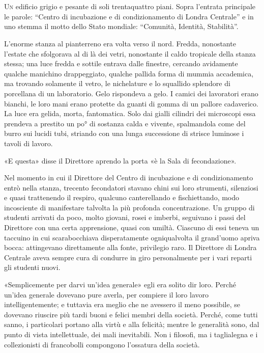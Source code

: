 \documentclass[
a5paper, %
10pt, %
twoside, 
onecolumn, %
openany, %
]{memoir}
\begin{document}
\mainmatter

\chapter{\phantom{text}} 

\lettrine{U}{n} edificio grigio e pesante di soli trentaquattro piani. Sopra l’entrata principale le parole: “Centro di incubazione e di condizionamento di Londra Centrale” e in uno stemma il motto dello Stato mondiale: “Comunità, Identità, Stabilità”.

L’enorme stanza al pianterreno era volta verso il nord. Fredda, nonostante l’estate che sfolgorava al di là dei vetri, nonostante il caldo tropicale della stanza stessa; una luce fredda e sottile entrava dalle finestre, cercando avidamente qualche manichino drappeggiato, qualche pallida forma di mummia accademica, ma trovando solamente il vetro, le nichelature e lo squallido splendore di porcellana di un laboratorio. Gelo rispondeva a gelo. I camici dei lavoratori erano bianchi, le loro mani erano protette da guanti di gomma di un pallore cadaverico. La luce era gelida, morta, fantomatica. Solo dai gialli cilindri dei microscopi essa prendeva a prestito un po° di sostanza calda e vivente, spalmandola come del burro sui lucidi tubi, striando con una lunga successione di strisce luminose i tavoli di lavoro.

«E questa» disse il Direttore aprendo la porta «è la Sala di fecondazione».

Nel momento in cui il Direttore del Centro di incubazione e di condizionamento entrò nella stanza, trecento fecondatori stavano chini sui loro strumenti, silenziosi e quasi trattenendo il respiro, qualcuno canterellando e fischiettando, modo incosciente di manifestare talvolta la più profonda concentrazione. Un gruppo di studenti arrivati da poco, molto giovani, rosei e imberbi, seguivano i passi del Direttore con una certa apprensione, quasi con umiltà. Ciascuno di essi teneva un taccuino in cui scarabocchiava disperatamente ogniqualvolta il grand’uomo apriva bocca: attingevano direttamente alla fonte, privilegio raro. Il Direttore di Londra Centrale aveva sempre cura di condurre in giro personalmente per i vari reparti gli studenti nuovi.

«Semplicemente per darvi un’idea generale» egli era solito dir loro. Perché un’idea generale dovevano pure averla, per compiere il loro lavoro intelligentemente; e tuttavia era meglio che ne avessero il meno possibile, se dovevano riuscire più tardi buoni e felici membri della società. Perché, come tutti sanno, i particolari portano alla virtù e alla felicità; mentre le generalità sono, dal punto di vista intellettuale, dei mali inevitabili. Non i filosofi, ma i taglialegna e i collezionisti di francobolli compongono l’ossatura della società.
\end{document}
